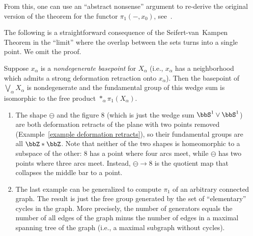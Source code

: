 From this, one can use an ``abstract nonsense'' argument to re-derive the original version of the theorem for the functor $\pi_1(-,x_0)$, see~\cite[\S 2.7]{May}.

The following is a straightforward consequence of the Seifert-van~Kampen Theorem in the ``limit'' where the overlap between the sets turns into a single point. We omit the proof.

\begin{cor}
    Suppose $x_\alpha$ is a \emph{nondegenerate basepoint} for $X_\alpha$ (i.e., $x_\alpha$ has a neighborhood which admits a strong deformation retraction onto $x_\alpha$). Then the basepoint of $\bigvee_{\alpha }X_\alpha$ is nondegenerate and the fundamental group of this wedge sum is isomorphic to the free product $\ast_{\alpha}\pi_1(X_\alpha)$.
\end{cor}

\begin{example}
\begin{enumerate}
    \item The shape $\ominus$ and the figure 8 (which is just the wedge sum $\bbS^1\vee \bbS^1$) are both deformation retracts of the plane with two points removed (Example~\ref{example deformation retracts}), so their fundamental groups are all $\bbZ\ast\bbZ$. Note that neither of the two shapes is homeomorphic to a subspace of the other: 8 has a point where four arcs meet, while $\ominus$ has two points where three arcs meet. Instead, $\ominus\to 8$ is the quotient map that collapses the middle bar to a point.
    \item The last example can be generalized to compute $\pi_1$ of an arbitrary connected graph. The result is just the free group generated by the set of ``elementary'' cycles in the graph. More precisely, the number of generators equals the number of all edges of the graph minus the number of edges in a maximal spanning tree of the graph (i.e., a maximal subgraph without cycles).
\end{enumerate}
\end{example}

